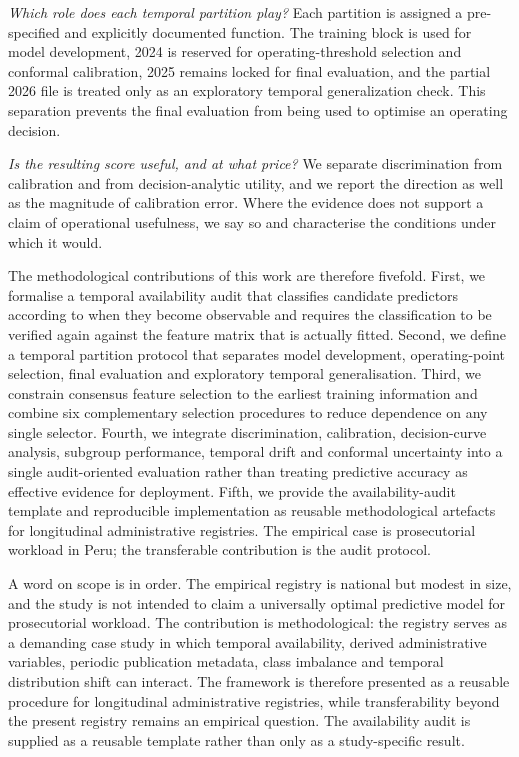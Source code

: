 \documentclass[sn-vancouver,Numbered]{sn-jnl}
\begin{document}
\emph{Which role does each temporal partition play?} Each partition is assigned a pre-specified and explicitly documented function. The training block is used for model development, 2024 is reserved for operating-threshold selection and conformal calibration, 2025 remains locked for final evaluation, and the partial 2026 file is treated only as an exploratory temporal generalization check. This separation prevents the final evaluation from being used to optimise an operating decision.

\emph{Is the resulting score useful, and at what price?} We separate discrimination from calibration and from decision-analytic utility, and we report the direction as well as the magnitude of calibration error. Where the evidence does not support a claim of operational usefulness, we say so and characterise the conditions under which it would.

The methodological contributions of this work are therefore fivefold. First, we formalise a temporal availability audit that classifies candidate predictors according to when they become observable and requires the classification to be verified again against the feature matrix that is actually fitted. Second, we define a temporal partition protocol that separates model development, operating-point selection, final evaluation and exploratory temporal generalisation. Third, we constrain consensus feature selection to the earliest training information and combine six complementary selection procedures to reduce dependence on any single selector. Fourth, we integrate discrimination, calibration, decision-curve analysis, subgroup performance, temporal drift and conformal uncertainty into a single audit-oriented evaluation rather than treating predictive accuracy as effective evidence for deployment. Fifth, we provide the availability-audit template and reproducible implementation as reusable methodological artefacts for longitudinal administrative registries. The empirical case is prosecutorial workload in Peru; the transferable contribution is the audit protocol.

A word on scope is in order. The empirical registry is national but modest in size, and the study is not intended to claim a universally optimal predictive model for prosecutorial workload. The contribution is methodological: the registry serves as a demanding case study in which temporal availability, derived administrative variables, periodic publication metadata, class imbalance and temporal distribution shift can interact. The framework is therefore presented as a reusable procedure for longitudinal administrative registries, while transferability beyond the present registry remains an empirical question. The availability audit is supplied as a reusable template rather than only as a study-specific result.
\end{document}
